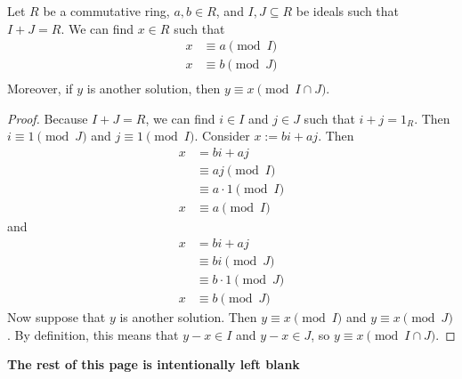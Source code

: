 \documentclass [12pt] {article}
\newenvironment{theorem}[1]{\begin{tcolorbox}[title={Theorem #1},colback=green!5!white,colframe=black!75!green]}{\end{tcolorbox}}
\renewcommand{\bf}[1]{\textbf{{#1}}}
\begin{document}
\newpage
\begin{theorem}{(Chinese Remainder Theorem [Rings])}
    \label{thm:crtrings}
    Let $R$ be a commutative ring, $a, b \in R$, and $I, J \subseteq R$ be ideals such that
    $I + J = R$. We can find $x \in R$ such that
    \begin{align*}
        x &\equiv a \pmod{I} \\
        x &\equiv b \pmod{J} \\
    \end{align*}
    Moreover, if $y$ is another solution, then $y \equiv x \pmod{I \cap J}$.
\end{theorem}
\begin{proof}
    Because $I + J = R$, we can find $i \in I$ and $j \in J$ such that $i + j = 1_R$. Then
    $i \equiv 1 \pmod{J}$ and $j \equiv 1 \pmod{I}$. Consider $x := bi + aj$. Then
    \begin{align*}
        x &= bi + aj \\
          &\equiv aj \pmod{I} \\
          &\equiv a \cdot 1 \pmod{I} \\
        x &\equiv a \pmod{I}
    \end{align*}
    and
    \begin{align*}
        x &= bi + aj \\
          &\equiv bi \pmod{J} \\
          &\equiv b \cdot 1 \pmod{J} \\
        x &\equiv b \pmod{J}
    \end{align*}
    Now suppose that $y$ is another solution. Then $y \equiv x \pmod{I}$ and $y \equiv x \pmod{J}$.
    By definition, this means that $y - x \in I$ and $y - x \in J$, so $y \equiv x \pmod{I \cap J}$.
\end{proof}

\begin{center}
    \vspace{5em}
    \bf{The rest of this page is intentionally left blank}
\end{center}
\end{document}
